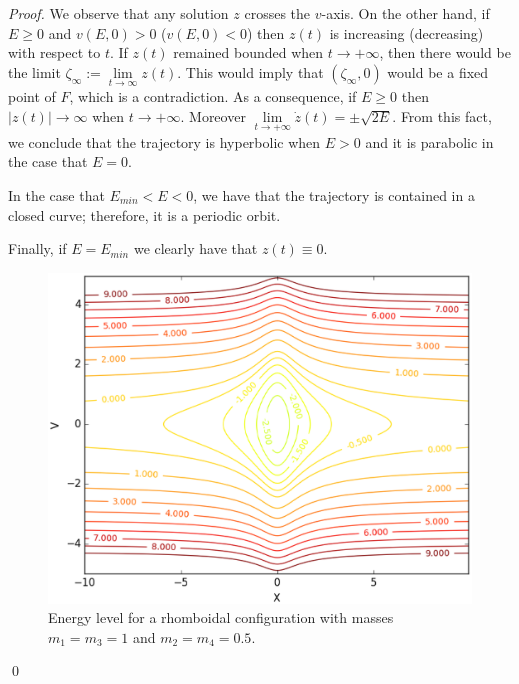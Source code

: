 \documentclass[smallcondensed]{svjour3}
\begin{document}
\begin{proof}
We observe that any solution $z$ crosses the $v$-axis. On the other hand, if $E\geq 0$ and $v(E,0)>0$ ($v(E,0)<0$) then $z(t)$ is increasing (decreasing) with respect to $t$. If $z(t)$ remained bounded when $t\to +\infty$, then there would be the limit $\zeta_{\infty}:=\lim\limits_{t\to\infty}z(t)$. This would imply  that $(\zeta_{\infty},0)$ would be a fixed point of $F$, which is a contradiction.  As a consequence, if $E\geq 0$ then $|z(t)|\to \infty$ when $t\to  +\infty$. Moreover $\lim\limits_{t\to +\infty}\dot{z}(t)=\pm\sqrt{2E}$.  From this fact, we conclude that the trajectory is hyperbolic when $E>0$ and it is parabolic in the case that $E=0$.

In the case that $E_{min}<E<0$, we have that the trajectory is contained in a closed curve; therefore, it is a periodic orbit.

Finally, if $E=E_{min}$  we clearly have that $z(t)\equiv 0$.
\begin{figure}[h]
\begin{center}
\includegraphics[scale=0.3]{figure_1.eps}
\caption{Energy level for a rhomboidal configuration with masses $m_1=m_3=1$ and $m_2=m_4=0.5$.}\label{fig:energy}
\end{center}
\end{figure}
\qed\end{proof}
\end{document}
